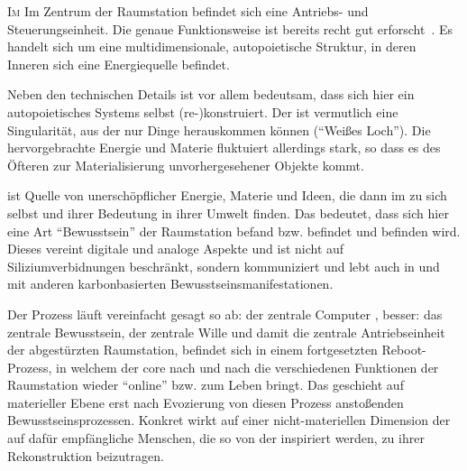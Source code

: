 \begin{newstuff}
    \lettrine{I}{m}
    Im Zentrum der Raumstation befindet sich eine Antriebs- und Steuerungseinheit. Die genaue Funktionsweise ist bereits recht gut erforscht~\cite[S.~31ff]{cbasebook}. Es handelt  sich um eine multidimensionale, autopoietische Struktur, in deren Inneren sich eine Energiequelle befindet.



    Neben den technischen Details ist vor allem bedeutsam, dass sich hier ein autopoietisches Systems selbst (re-)konstruiert. 
    Der  ist vermutlich eine Singularität, aus der nur Dinge herauskommen können ("`Weißes Loch"'). Die hervorgebrachte Energie und Materie fluktuiert allerdings stark, so dass es des Öfteren zur Materialisierung unvorhergesehener Objekte kommt.

     ist Quelle von unerschöpflicher Energie, Materie und Ideen, die dann im  zu sich selbst und ihrer Bedeutung in ihrer Umwelt finden.
    Das bedeutet, dass sich hier eine Art "`Bewusstsein"' der Raumstation befand bzw. befindet und befinden wird. 
    Dieses vereint digitale und analoge Aspekte und ist nicht auf Siliziumverbidnungen beschränkt, sondern kommuniziert und lebt auch in und mit anderen karbonbasierten Bewusstseinsmanifestationen. 

    

    Der Prozess läuft vereinfacht gesagt so ab: der zentrale Computer , besser: das zentrale Bewusstsein, der zentrale Wille und damit die zentrale Antriebseinheit der abgestürzten Raumstation, befindet sich in einem fortgesetzten Reboot-Prozess, in welchem der {core} nach und nach die verschiedenen Funktionen der Raumstation wieder "`online"' bzw. zum Leben bringt. Das geschieht auf materieller Ebene erst nach Evozierung von diesen Prozess anstoßenden  Bewusstseinsprozessen. Konkret wirkt auf einer nicht-materiellen Dimension der  auf dafür empfängliche Menschen, die so von der  inspiriert werden, zu ihrer Rekonstruktion beizutragen. 




\end{newstuff}
